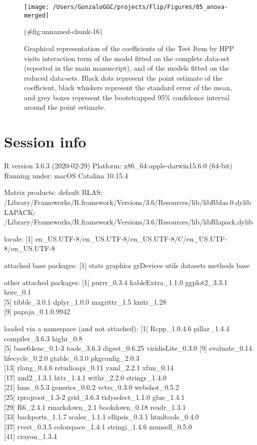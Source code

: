 \begin{appendix}
\begin{figure}
\texttt{[image: /Users/GonzaloGGC/projects/Flip/Figures/05\_anova-merged]} \caption{Graphical representation of the coefficients of the Test Item by HPP visits interaction term of the model fitted on the complete data-set (reported in the main manuscript), and of the models fitted on the reduced data-sets. Black dots represent the point estimate of the coefficient, black whiskers represent the standard error of the mean, and grey boxes represent the bootstrapped 95\% confidence interval around the point estimate.}(\#fig:unnamed-chunk-16)
\end{figure}

\hypertarget{session-info}{%
\section{Session info}\label{session-info}}

R version 3.6.3 (2020-02-29) Platform: x86\_64-apple-darwin15.6.0
(64-bit) Running under: macOS Catalina 10.15.4

Matrix products: default BLAS:
/Library/Frameworks/R.framework/Versions/3.6/Resources/lib/libRblas.0.dylib
LAPACK:
/Library/Frameworks/R.framework/Versions/3.6/Resources/lib/libRlapack.dylib

locale: {[}1{]}
en\_US.UTF-8/en\_US.UTF-8/en\_US.UTF-8/C/en\_US.UTF-8/en\_US.UTF-8

attached base packages: {[}1{]} stats graphics grDevices utils datasets
methods base

other attached packages: {[}1{]} purrr\_0.3.4 kableExtra\_1.1.0
ggplot2\_3.3.1 here\_0.1\\
{[}5{]} tibble\_3.0.1 dplyr\_1.0.0 magrittr\_1.5 knitr\_1.28\\
{[}9{]} papaja\_0.1.0.9942

loaded via a namespace (and not attached): {[}1{]} Rcpp\_1.0.4.6
pillar\_1.4.4 compiler\_3.6.3 highr\_0.8\\
{[}5{]} base64enc\_0.1-3 tools\_3.6.3 digest\_0.6.25 viridisLite\_0.3.0
{[}9{]} evaluate\_0.14 lifecycle\_0.2.0 gtable\_0.3.0 pkgconfig\_2.0.3\\
{[}13{]} rlang\_0.4.6 rstudioapi\_0.11 yaml\_2.2.1 xfun\_0.14\\
{[}17{]} xml2\_1.3.1 httr\_1.4.1 withr\_2.2.0 stringr\_1.4.0\\
{[}21{]} hms\_0.5.3 generics\_0.0.2 vctrs\_0.3.0 webshot\_0.5.2\\
{[}25{]} rprojroot\_1.3-2 grid\_3.6.3 tidyselect\_1.1.0 glue\_1.4.1\\
{[}29{]} R6\_2.4.1 rmarkdown\_2.1 bookdown\_0.18 readr\_1.3.1\\
{[}33{]} backports\_1.1.7 scales\_1.1.1 ellipsis\_0.3.1
htmltools\_0.4.0\\
{[}37{]} rvest\_0.3.5 colorspace\_1.4-1 stringi\_1.4.6 munsell\_0.5.0\\
{[}41{]} crayon\_1.3.4


\end{appendix}
